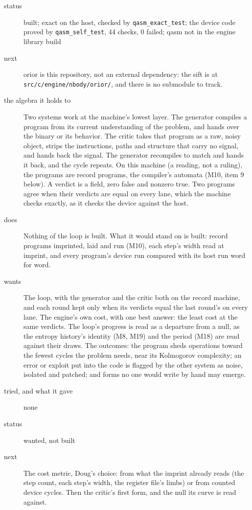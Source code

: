 \begin{description}
\item[{status}] built; exact on the host, checked by \texttt{qasm\_\allowbreak{}exact\_\allowbreak{}test}; the device code proved by \texttt{qasm\_\allowbreak{}self\_\allowbreak{}test}, 44 checks, 0 failed; qasm not in the engine library build
\item[{next}] orior is this repository, not an external dependency: the sift is at \texttt{src/\allowbreak{}c/\allowbreak{}engine/\allowbreak{}nbody/\allowbreak{}orior/\allowbreak{}}, and there is no submodule to track.
\end{description}

\begin{description}
\item[{the algebra it holds to}] Two systems work at the machine's lowest layer. The generator compiles a program from its current understanding of the problem, and hands over the binary or its behavior. The critic takes that program as a raw, noisy object, strips the instructions, paths and structure that carry no signal, and hands back the signal. The generator recompiles to match and hands it back, and the cycle repeats. On this machine (a reading, not a ruling), the programs are record programs, the compiler's automata (M10, item 9 below). A verdict is a field, zero false and nonzero true. Two programs agree when their verdicts are equal on every lane, which the machine checks exactly, as it checks the device against the host.
\item[{does}] Nothing of the loop is built. What it would stand on is built: record programs imprinted, laid and run (M10), each step's width read at imprint, and every program's device run compared with its host run word for word.
\item[{wants}] The loop, with the generator and the critic both on the record machine, and each round kept only when its verdicts equal the last round's on every lane. The engine's own cost, with one best answer: the least cost at the same verdicts. The loop's progress is read as a departure from a null, as the entropy history's identity (M8, M19) and the period (M18) are read against their draws. The outcomes: the program sheds operations toward the fewest cycles the problem needs, near its Kolmogorov complexity; an error or exploit put into the code is flagged by the other system as noise, isolated and patched; and forms no one would write by hand may emerge.
\item[{tried, and what it gave}] none
\item[{status}] wanted, not built
\item[{next}] The cost metric, Doug's choice: from what the imprint already reads (the step count, each step's width, the register file's limbs) or from counted device cycles. Then the critic's first form, and the null its curve is read against.
\end{description}

